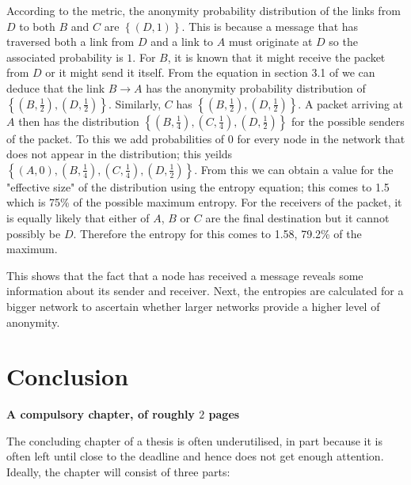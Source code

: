\documentclass[ %
                    author={Luke Murray},
                supervisor={Dr. Simon Hollis},
                     title={Shadow Peer-to-Peer Networks},
                  subtitle={},
                    degree={MEng},
                      year={2013} ]{thesis}
\begin{document}
According to the metric, the anonymity probability distribution of the links from $D$ to both $B$ and $C$ are $\left\{(D, 1)\right\}$. This is because a message that has traversed both a link from $D$ and a link to $A$ must originate at $D$ so the associated probability is $1$. For $B$, it is known that it might receive the packet from $D$ or it might send it itself. From the equation in section 3.1 of \cite{serjantov2003towards} we can deduce that the link $B \rightarrow A$ has the anonymity probability distribution of $\left\{(B, \frac{1}{2}), (D, \frac{1}{2})\right\}$. Similarly, $C$ has $\left\{(B, \frac{1}{2}), (D, \frac{1}{2})\right\}$. A packet arriving at $A$ then has the distribution $\left\{(B, \frac{1}{4}), (C, \frac{1}{4}), (D, \frac{1}{2})\right\}$ for the possible senders of the packet. To this we add probabilities of 0 for every node in the network that does not appear in the distribution; this yeilds $\left\{(A, 0), (B, \frac{1}{4}), (C, \frac{1}{4}), (D, \frac{1}{2})\right\}$. From this we can obtain a value for the "effective size" of the distribution using the entropy equation; this comes to 1.5 which is 75\% of the possible maximum entropy. For the receivers of the packet, it is equally likely that either of $A$, $B$ or $C$ are the final destination but it cannot possibly be $D$. Therefore the entropy for this comes to 1.58, 79.2\% of the maximum.

This shows that the fact that a node has received a message reveals some information about its sender and receiver. Next, the entropies are calculated for a bigger network to ascertain whether larger networks provide a higher level of anonymity.



\chapter{Conclusion}
\label{chap:conclusion}

{\bf A compulsory chapter, of roughly $2$ pages} 
\vspace{1cm} 

\noindent
The concluding chapter of a thesis is often underutilised, in part because
it is often left until close to the deadline and hence does not get enough 
attention.  Ideally, the chapter will consist of three parts:
\end{document}
